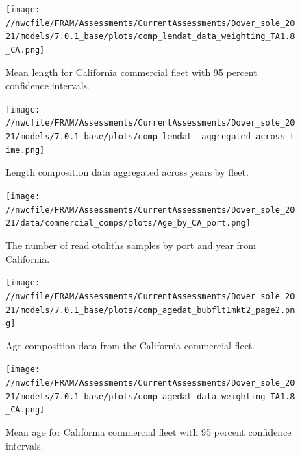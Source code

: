 \documentclass[11pt,
  english,
  a4paper,
]{article}
\begin{document}
\begin{figure}
\centering
\texttt{[image: //nwcfile/FRAM/Assessments/CurrentAssessments/Dover\_sole\_2021/models/7.0.1\_base/plots/comp\_lendat\_data\_weighting\_TA1.8\_CA.png]}
\caption{Mean length for California commercial fleet with 95 percent confidence intervals.\label{fig:mean-ca-len-data}}
\end{figure}

\tagmcend\tagstructend


\begin{figure}
\centering
\texttt{[image: //nwcfile/FRAM/Assessments/CurrentAssessments/Dover\_sole\_2021/models/7.0.1\_base/plots/comp\_lendat\_\_aggregated\_across\_time.png]}
\caption{Length composition data aggregated across years by fleet.\label{fig:agg-len-data}}
\end{figure}

\tagmcend\tagstructend


\begin{figure}
\centering
\texttt{[image: //nwcfile/FRAM/Assessments/CurrentAssessments/Dover\_sole\_2021/data/commercial\_comps/plots/Age\_by\_CA\_port.png]}
\caption{The number of read otoliths samples by port and year from California.\label{fig:ca-age-port}}
\end{figure}

\tagmcend\tagstructend


\begin{figure}
\centering
\texttt{[image: //nwcfile/FRAM/Assessments/CurrentAssessments/Dover\_sole\_2021/models/7.0.1\_base/plots/comp\_agedat\_bubflt1mkt2\_page2.png]}
\caption{Age composition data from the California commercial fleet.\label{fig:ca-age-data}}
\end{figure}

\tagmcend\tagstructend


\begin{figure}
\centering
\texttt{[image: //nwcfile/FRAM/Assessments/CurrentAssessments/Dover\_sole\_2021/models/7.0.1\_base/plots/comp\_agedat\_data\_weighting\_TA1.8\_CA.png]}
\caption{Mean age for California commercial fleet with 95 percent confidence intervals.\label{fig:mean-ca-age-data}}
\end{figure}
\end{document}
